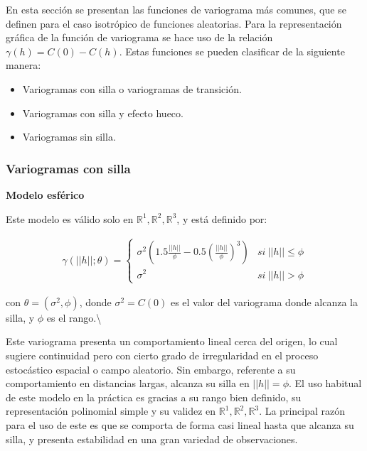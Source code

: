 \documentclass[
]{book}
\providecommand{\tightlist}{%
  \setlength{\itemsep}{0pt}\setlength{\parskip}{0pt}}
\begin{document}
En esta sección se presentan las funciones de variograma más comunes, que se definen para el caso isotrópico de funciones aleatorias. Para la representación gráfica de la función de variograma se hace uso de la relación \(\gamma(h)=C(0)-C(h)\). Estas funciones se pueden clasificar de la siguiente manera:

\begin{itemize}
\tightlist
\item
  Variogramas con silla o variogramas de transición.
\item
  Variogramas con silla y efecto hueco.
\item
  Variogramas sin silla.
\end{itemize}

\hypertarget{variogramas-con-silla}{%
\subsubsection*{Variogramas con silla}\label{variogramas-con-silla}}

\textbf{Modelo esférico}

Este modelo es válido solo en \(\mathbb{R}^1,\mathbb{R}^2,\mathbb{R}^3\), y está definido por:

\begin{align*}
    \gamma(||h||;\theta) = \left \{ \begin{matrix} \sigma^2\left(1.5\frac{||h||}{\phi}-0.5\left(\frac{||h||}{\phi}\right)^3 \right) &  si \ ||h||\leq \phi
\\ \sigma^2 &  si\ ||h||>\phi \end{matrix}\right. 
\end{align*}

con \(\theta=(\sigma^2,\phi)\), donde \(\sigma^2=C(0)\) es el valor del variograma donde alcanza la silla, y \(\phi\) es el rango.\textbackslash{}

Este variograma presenta un comportamiento lineal cerca del origen, lo cual sugiere continuidad pero con cierto grado de irregularidad en el proceso estocástico espacial o campo aleatorio. Sin embargo, referente a su comportamiento en distancias largas, alcanza su silla en \(||h||=\phi\). El uso habitual de este modelo en la práctica es gracias a su rango bien definido, su representación polinomial simple y su validez en \(\mathbb{R}^1,\mathbb{R}^2,\mathbb{R}^3\). La principal razón para el uso de este es que se comporta de forma casi lineal hasta que alcanza su silla, y presenta estabilidad en una gran variedad de observaciones.
\end{document}
